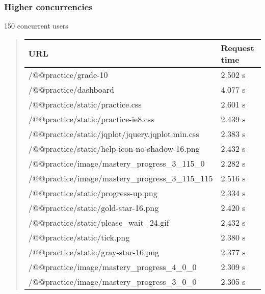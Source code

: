 \documentclass[letterpaper,10pt,english]{sphinxmanual}
\begin{document}
\subsubsection{Higher concurrencies}
\label{index:id5}
150 concurrent users
\begin{quote}

\begin{tabulary}{\linewidth}{|L|L|}
\hline
\textbf{\relax 
URL
} & \textbf{\relax 
Request time
}\\\hline

/@@practice/grade-10
 & 
2.502 s
\\\hline

/@@practice/dashboard
 & 
4.077 s
\\\hline

/@@practice/static/practice.css
 & 
2.601 s
\\\hline

/@@practice/static/practice-ie8.css
 & 
2.439 s
\\\hline

/@@practice/static/jqplot/jquery.jqplot.min.css
 & 
2.383 s
\\\hline

/@@practice/static/help-icon-no-shadow-16.png
 & 
2.432 s
\\\hline

/@@practice/image/mastery\_progress\_3\_115\_0
 & 
2.282 s
\\\hline

/@@practice/image/mastery\_progress\_3\_115\_115
 & 
2.516 s
\\\hline

/@@practice/static/progress-up.png
 & 
2.334 s
\\\hline

/@@practice/static/gold-star-16.png
 & 
2.420 s
\\\hline

/@@practice/static/please\_wait\_24.gif
 & 
2.432 s
\\\hline

/@@practice/static/tick.png
 & 
2.380 s
\\\hline

/@@practice/static/gray-star-16.png
 & 
2.377 s
\\\hline

/@@practice/image/mastery\_progress\_4\_0\_0
 & 
2.309 s
\\\hline

/@@practice/image/mastery\_progress\_3\_0\_0
 & 
2.305 s
\\\hline


\end{tabulary}
\end{quote}
\end{document}
